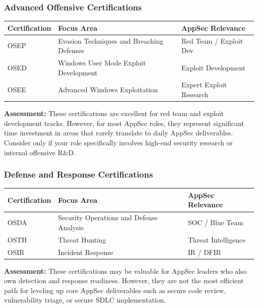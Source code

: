 \documentclass[11pt,letterpaper]{article}
\begin{document}
\subsubsection{Advanced Offensive Certifications}

\begin{table}[H]
\centering
\begin{tabularx}{\textwidth}{l X l}
\toprule
\textbf{Certification} & \textbf{Focus Area} & \textbf{AppSec Relevance} \\
\midrule
OSEP & Evasion Techniques and Breaching Defenses & Red Team / Exploit Dev \\
OSED & Windows User Mode Exploit Development & Exploit Development \\
OSEE & Advanced Windows Exploitation & Expert Exploit Research \\
\bottomrule
\end{tabularx}
\end{table}

\textbf{Assessment:} These certifications are excellent for red team and exploit development tracks. However, for most AppSec roles, they represent significant time investment in areas that rarely translate to daily AppSec deliverables. Consider only if your role specifically involves high-end security research or internal offensive R\&D.

\subsubsection{Defense and Response Certifications}

\begin{table}[H]
\centering
\begin{tabularx}{\textwidth}{l X l}
\toprule
\textbf{Certification} & \textbf{Focus Area} & \textbf{AppSec Relevance} \\
\midrule
OSDA & Security Operations and Defense Analysis & SOC / Blue Team \\
OSTH & Threat Hunting & Threat Intelligence \\
OSIR & Incident Response & IR / DFIR \\
\bottomrule
\end{tabularx}
\end{table}

\textbf{Assessment:} These certifications may be valuable for AppSec leaders who also own detection and response readiness. However, they are not the most efficient path for leveling up core AppSec deliverables such as secure code review, vulnerability triage, or secure SDLC implementation.
\end{document}
